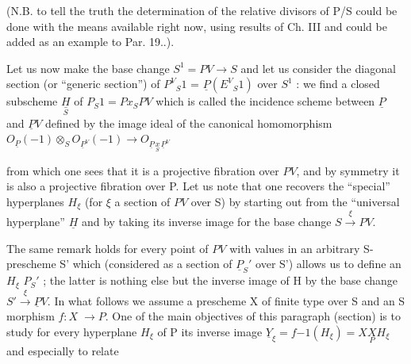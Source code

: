 
(N.B. to tell the truth the determination of the relative divisors
of P/S could be done with the means available right now, using
results of Ch. III and could be added as an example to Par. 19..).

Let us now make the base change $S^1 = PV \to S$ and let us
consider the diagonal section (or ``generic section'') of $P^V{}_{S}1$ =
$\underline{P}(E^V{}_{S}1)$ over $S^1$ : we find a closed subscheme $\underset{S}{\underline{H}}$ of $P_S 1 = P x_S PV$
which is called the incidence scheme between $\underline{P}$ and $\underline{P}V$ defined by
the image ideal of the canonical homomorphism
$O_{\underline{P}}(-1) \otimes_S O_{\underline{P}^V}(-1) \to O_{\underline{P}\,\underset{S}{x}\,\underline{P}^V}$

from which one sees that it is a projective fibration over $PV$, and
by symmetry it is also a projective fibration over P.  Let us note
that one recovers the ``special'' hyperplanes $H_\xi$ (for $\xi$ a section of
$PV$ over S) by starting out from the ``universal hyperplane'' $\underline{H}$ and by
taking its inverse image for the base change $S \xrightarrow{\xi} PV$.

The same remark holds for every point of $PV$ with values in an
arbitrary S-prescheme S' which (considered as a section of $\underline{P}_S{}'$ over
S') allows us to define an $H_\xi$ \hand{$\subset$} $P_S{}'$ ; the latter is nothing else
but the inverse image of H by the base change $S' \xrightarrow{\xi} \underline{P}V$.  In what
follows we assume a prescheme X of finite type over S and an S
morphism $f{:}X \;\to P$.  One of the main objectives of this paragraph
(section) is to study for every hyperplane $H_\xi$ of P its inverse
image $\underline{Y}_\xi = f{-1}(H_\xi) = X \underset{P}{X} H_\xi$ and especially to relate
